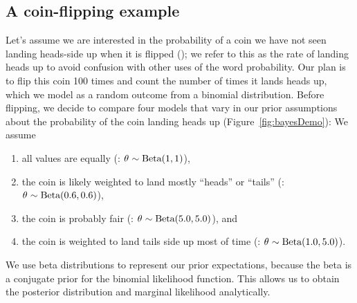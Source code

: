 \subsection{A coin-flipping example}

Let's assume we are interested in the probability of a coin we have not seen
landing heads-side up when it is flipped (\probheads);
we refer to this as the rate of landing heads up to avoid confusion with other
uses of the word probability.
Our plan is to flip this coin 100 times and count the number of times it lands
heads up, which we model as a random outcome from a binomial distribution.
Before flipping, we decide to compare four models that vary in our prior
assumptions about the probability of the coin landing heads up
(Figure~\ref{fig:bayesDemo}):
We assume
\begin{enumerate}
    \item all values are equally 
        (\coinmodel[1]: $\theta_{} \sim \textrm{Beta}(1, 1)$),
    \item the coin is likely weighted to land mostly ``heads'' or ``tails''
        (\coinmodel[2]: $\theta_{} \sim \textrm{Beta}(0.6, 0.6)$),
    \item the coin is probably fair
        (\coinmodel[3]: $\theta_{} \sim \textrm{Beta}(5.0, 5.0)$), and
    \item the coin is weighted to land tails side up most of time
        (\coinmodel[4]: $\theta_{} \sim \textrm{Beta}(1.0, 5.0)$).
\end{enumerate}
We use beta distributions to represent our prior expectations, because the
beta is a conjugate prior for the binomial likelihood function.
This allows us to obtain the posterior distribution and marginal likelihood
analytically.


